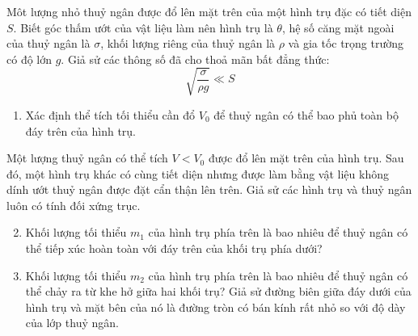 \noindent Môt lượng nhỏ thuỷ ngân được đổ lên mặt trên của một hình trụ đặc có tiết diện $S$. Biết góc thấm ướt của vật liệu làm nên hình trụ là $\theta$, hệ số căng mặt ngoài của thuỷ ngân là $\sigma$, khối lượng riêng của thuỷ ngân là $\rho$ và gia tốc trọng trường có độ lớn $g$. Giả sử các thông số đã cho thoả mãn bất đẳng thức:
\begin{equation*}
  \sqrt{\frac{\sigma}{\rho g}}\ll S
\end{equation*}
\begin{enumerate}
  \item Xác định thể tích tối thiểu cần đổ $V_{0}$ để thuỷ ngân có thể bao phủ toàn bộ đáy trên của hình trụ.
\end{enumerate}
\noindent Một lượng thuỷ ngân có thể tích $V<V_{0}$ được đổ lên mặt trên của hình trụ. Sau đó, một hình trụ khác có cùng tiết diện nhưng được làm bằng vật liệu không dính ướt thuỷ ngân được đặt cẩn thận lên trên. Giả sử các hình trụ và thuỷ ngân luôn có tính đối xứng trục.
\begin{enumerate}
  \setcounter{enumi}{1}
  \item Khối lượng tối thiểu $m_{1}$ của hình trụ phía trên là bao nhiêu để thuỷ ngân có thể tiếp xúc hoàn toàn với đáy trên của khối trụ phía dưới?
  \item Khối lượng tối thiểu $m_{2}$ của hình trụ phía trên là bao nhiêu để thuỷ ngân có thể chảy ra từ khe hở giữa hai khối trụ? Giả sử đường biên giữa đáy dưới của hình trụ và mặt bên của nó là đường tròn có bán kính rất nhỏ so với độ dày của lớp thuỷ ngân.
\end{enumerate}
